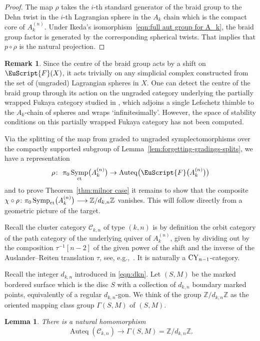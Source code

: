 \documentclass[pdftex]{sigma}
\DeclareMathOperator{\Auteq}{Auteq}
\newcommand{\scrF}{\EuScript{F}}
\DeclareMathOperator{\Symp}{Symp}
\def\bZ{\mathbb{Z}}
\newtheorem{lem}[thm]{Lemma}
\theoremstyle{definition}
\newtheorem{rmk}[thm]{Remark}
\numberwithin{equation}{section}
\begin{document}
\begin{proof}
The map $\rho$ takes the $i$-th standard generator of the braid group to the Dehn twist in the $i$-th Lagrangian sphere in the $A_k$ chain which is the compact core of $A_k^{(n)}$. Under Ikeda's isomorphism~\eqref{eqn:full aut group for A_k}, the braid group factor is generated by the corresponding spherical twists. That implies that $p \circ \rho$ is the natural projection.
\end{proof}

\begin{rmk}
Since the centre of the braid group acts by a shift on $\scrF(X)$, it acts trivially on any simplicial complex constructed from the set of (ungraded) Lagrangian spheres in $X$. One can detect the centre of the braid group through its action on the ungraded category underlying the partially wrapped Fukaya category studied in \cite[Section~20]{Seidel:FCPLT}, which adjoins a single Lefschetz thimble to the $A_k$-chain of spheres and wraps `infinitesimally'. However, the space of stability conditions on this partially wrapped Fukaya category has not been computed.
\end{rmk}

Via the splitting of the map from graded to ungraded symplectomorphisms over the compactly supported subgroup of Lemma~\ref{lem:forgetting-gradings-splits}, we have a representation
\[
\rho\colon \ \pi_0\Symp_{\rm ct}\bigl(A_k^{(n)}\bigr) \to \Auteq\bigl(\scrF\bigl(A_k^{(n)}\bigr)\bigr)
\]
and to prove Theorem~\ref{thm:milnor case} it remains to show that the composite $\chi \circ \rho\colon \pi_0\Symp_{\rm ct}\bigl(A_k^{(n)}\bigr) \longrightarrow \bZ/d_{k,n}\bZ$ vanishes. This will follow directly from a geometric picture of the target.

 Recall the cluster category $\mathcal{C}_{k,n}$ of type $(k,n)$ is by definition the orbit category of the path category of the underlying quiver of $A_k^{(n)}$, given by dividing out by the composition $\tau^{-1}[n-2]$ of the given power of the shift and the inverse of the Auslander--Reiten translation $\tau$, see, e.g.,~\cite{Baur-Marsh}. It is naturally a ${\rm CY}_{n-1}$-category.

 Recall the integer $d_{k,n}$ introduced in \eqref{eqn:dkn}.
 Let $(S,M)$ be the marked bordered surface which is the disc $S$ with a collection of $d_{k,n}$ boundary marked points, equivalently of a regular $d_{k,n}$-gon.
 We think of the group $\bZ/d_{k,n}\bZ$ as the oriented mapping class group $\Gamma(S, M)$ of $(S,M)$.

 \begin{lem}
 There is a natural homomorphism
 \[
\Auteq(\mathcal{C}_{k,n}) \longrightarrow \Gamma(S,M) = \bZ/d_{k,n}\bZ.
\]
 \end{lem}
\end{document}

